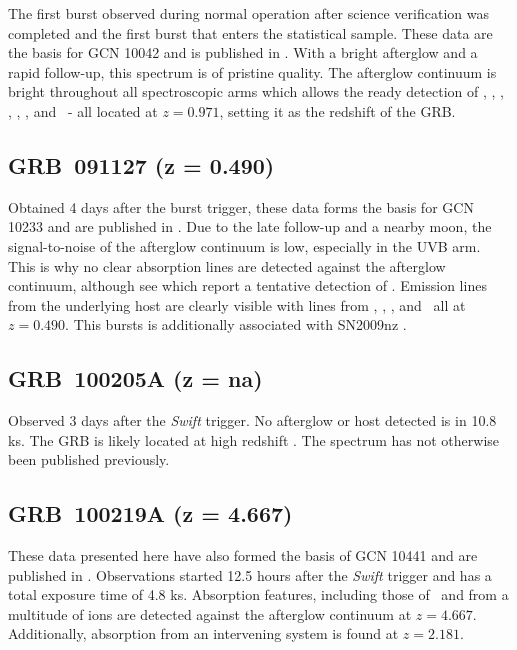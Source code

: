 \documentclass[longauth]{aa}    %
\begin{document}
The first burst observed during normal operation after science verification was
completed and the first burst that enters the statistical sample. These data are
the basis for GCN 10042 \citep{GCN10042} and is published in
\citet{Wiersema2012}. With a bright afterglow and a rapid follow-up, this
spectrum is of pristine quality. The afterglow continuum is bright throughout
all spectroscopic arms which allows the ready detection of \alii, \aliii, \feii,
\mnii, \mgii, \mgi, and \caii~- all located at $z = 0.971$, setting it as the
redshift of the GRB.

\subsection{GRB~091127 (z = 0.490)} \label{091127}

Obtained 4 days after the burst trigger, these data forms the basis for GCN 10233
\citep{GCN10233} and are published in \citet{Vergani2011}. Due to the late
follow-up and a nearby moon, the signal-to-noise of the afterglow continuum is
low, especially in the UVB arm. This is why no clear absorption lines are detected
against the afterglow continuum, although see \citet{Vergani2011} which report a
tentative detection of \mgii. Emission lines from the underlying host are clearly
visible with lines from \oii, \hb, \oiii, and \ha~all at $z = 0.490$. This
bursts is additionally associated with SN2009nz \citep{Cobb2010, Berger2011, Olivares2015}.

\subsection{GRB~100205A  (z = na)} \label{100205}

Observed 3 days after the \textit{Swift} trigger. No afterglow or host detected
is in 10.8 ks. The GRB is likely located at high redshift \citep[GCN
GCN10399;][]{GCN10399}. The spectrum has not otherwise been published
previously.

\subsection{GRB~100219A (z = 4.667)} \label{100219}

These data presented here have also formed the basis of GCN 10441 \citep{GCN10441} and
are published in \citet{Thone2013}. Observations started 12.5 hours after the
\textit{Swift} trigger and has a total exposure time of 4.8 ks. Absorption
features, including those of \lya~and from a multitude of ions are detected
against the afterglow continuum at $z = 4.667$. Additionally, absorption from an
intervening system is found at $z = 2.181$.
\end{document}
